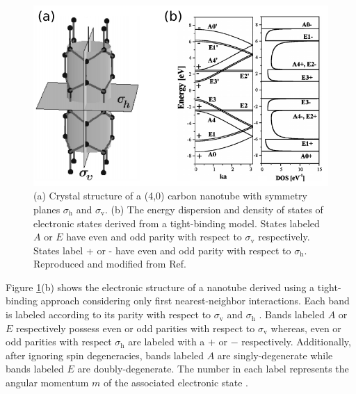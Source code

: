\begin{figure}[ht]
	\centering
	\includegraphics[scale=1.2]{images/chapter_optical_props/cnt_symmetry_2_bozovic}
	\caption{(a) Crystal structure of a (4,0) carbon nanotube with symmetry planes $\sigma_\text{h}$ and $\sigma_\text{v}$. %
	(b) The energy dispersion and density of states of electronic states derived from a tight-binding model. States labeled $A$ or $E$ have even and odd parity with respect to $\sigma_\text{v}$ respectively. States label + or - have even and odd parity with respect to $\sigma_\text{h}$.  Reproduced and modified from Ref.\ \cite{bovzovic2000optical} }
	\label{fig:cnt_symmetries}
\end{figure}


Figure \ref{fig:cnt_symmetries}(b) shows the electronic structure of a nanotube derived using a tight-binding approach considering only first nearest-neighbor interactions. Each band is labeled according to its parity with respect to  $\sigma_\text{v}$ and $\sigma_\text{h}$ \cite{bovzovic2000optical}. Bands labeled $A$ or $E$ respectively possess even or odd parities with respect to $\sigma_\text{v}$ \cite{bovzovic2000optical} whereas, even or odd parities with respect $\sigma_\text{h}$ are labeled with a $+$ or $-$ respectively. Additionally, after ignoring spin degeneracies, bands labeled $A$ are singly-degenerate while bands labeled $E$ are doubly-degenerate. The number in each label represents the angular momentum $m$ of the associated electronic state \cite{bovzovic2000optical}.

